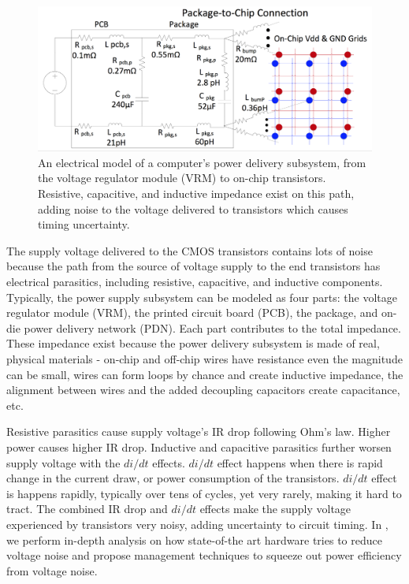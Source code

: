 \begin{figure}[t!]
  \centering
  \includegraphics[trim=0 0 0 0,clip,width=0.8\linewidth]{graphs/background/pdn-model.png}
  \caption{An electrical model of a computer's power delivery subsystem, from the voltage regulator module (VRM) to on-chip transistors. Resistive, capacitive, and inductive impedance exist on this path, adding noise to the voltage delivered to transistors which causes timing uncertainty.}
  \label{fig:pdn-model}
\end{figure}

The supply voltage delivered to the CMOS transistors contains lots of noise because the path from the source of voltage supply to the end transistors has electrical parasitics, including resistive, capacitive, and inductive components. Typically, the power supply subsystem can be modeled as four parts: the voltage regulator module (VRM), the printed circuit board (PCB), the package, and on-die power delivery network (PDN). Each part contributes to the total impedance. These impedance exist because the power delivery subsystem is made of real, physical materials - on-chip and off-chip wires have resistance even the magnitude can be small, wires can form loops by chance and create inductive impedance, the alignment between wires and the added decoupling capacitors create capacitance, etc.

Resistive parasitics cause supply voltage's IR drop following Ohm's law. Higher power causes higher IR drop. Inductive and capacitive parasitics further worsen supply voltage with the $di/dt$ effects. $di/dt$ effect happens when there is rapid change in the current draw, or power consumption of the transistors. $di/dt$ effect is happens rapidly, typically over tens of cycles, yet very rarely, making it hard to tract. The combined IR drop and $di/dt$ effects make the supply voltage experienced by transistors very noisy, adding uncertainty to circuit timing. In , we perform in-depth analysis on how state-of-the art hardware tries to reduce voltage noise and propose management techniques to squeeze out power efficiency from voltage noise.

